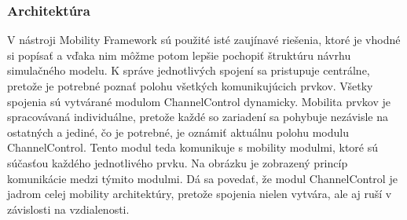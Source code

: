 \subsubsection{Architektúra}
\indent\indent V nástroji Mobility Framework sú použité isté zaujínavé riešenia, ktoré je vhodné si popísať a vďaka nim môžme potom lepšie pochopiť štruktúru návrhu simulačného modelu. K správe jednotlivých spojení sa pristupuje centrálne, pretože je potrebné poznať polohu všetkých komunikujúcich prvkov. Všetky spojenia sú vytvárané modulom \ttfamily ChannelControl \rmfamily dynamicky. Mobilita prvkov je spracovávaná individuálne, pretože každé so zariadení sa pohybuje nezávisle na ostatných a jediné, čo je potrebné, je oznámiť aktuálnu polohu modulu \ttfamily ChannelControl\rmfamily. Tento modul teda komunikuje s mobility modulmi, ktoré sú súčasťou každého jednotlivého prvku. Na obrázku je zobrazený princíp komunikácie medzi týmito modulmi. Dá sa povedať, že modul \ttfamily ChannelControl \rmfamily je jadrom celej mobility architektúry, pretože spojenia nielen vytvára, ale aj ruší v závislosti na vzdialenosti.\\

